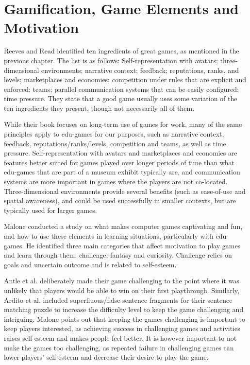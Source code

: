 
\section{Gamification, Game Elements and Motivation}

Reeves and Read\citep{Reeves} identified ten ingredients of great games, as mentioned in the previous chapter. The list is as follows: Self-representation with avatars; three-dimensional environments; narrative context; feedback; reputations, ranks, and levels; marketplaces and economies; competition under rules that are explicit and enforced; teams; parallel communication systems that can be easily configured; time pressure. They state that a good game usually uses some variation of the ten ingredients they present, though not necessarily all of them.

While their book focuses on long-term use of games for work, many of the same principles apply to edu-games for our purposes, such as narrative context, feedback, reputations/ranks/levels, competition and teams, as well as time pressure. Self-representation with avatars and marketplaces and economies are features better suited for games played over longer periods of time than what edu-games that are part of a museum exhibit typically are, and communication systems are more important in games where the players are not co-located. Three-dimensional environments provide several benefits (such as ease-of-use and spatial awareness), and could be used successfully in smaller contexts, but are typically used for larger games.

Malone\citep{Malone} conducted a study on what makes computer games captivating and fun, and how to use these elements in learning situations, particularly with edu-games. He identified three main categories that affect motivation to play games and learn through them: challenge, fantasy and curiosity. Challenge relies on goals and uncertain outcome and is related to self-esteem.

Antle et al. deliberately made their game challenging to the point where it was unlikely that players would be able to win on their first playthrough. Similarly, Ardito et al. included superfluous/false sentence fragments for their sentence matching puzzle to increase the difficulty level to keep the game challenging and intriguing. Malone points out that keeping the games challenging is important to keep players interested, as achieving success in challenging games and activities raises self-esteem and makes people feel better. It is however important to not make the games too challenging, as repeated failure in challenging games can lower players' self-esteem and decrease their desire to play the game.

